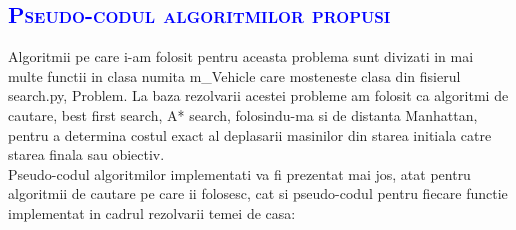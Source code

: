 \documentclass{article}
\begin{document}
\newpage
	\begin{center}
	    \textcolor{blue}{\section{\bfseries\scshape\textcolor{blue}{Pseudo-codul algoritmilor propusi}}}
	   \vspace{10mm}
	\end{center}
\quad Algoritmii pe care i-am folosit pentru aceasta problema sunt divizati in mai multe functii in clasa numita m\_Vehicle care mosteneste clasa din fisierul search.py, Problem. La baza rezolvarii acestei probleme am folosit ca algoritmi de cautare, best first search, A* search, folosindu-ma si de distanta Manhattan, pentru a determina costul exact al deplasarii masinilor din starea initiala catre starea finala sau obiectiv.
\newline \\
Pseudo-codul algoritmilor implementati va fi prezentat mai jos, atat pentru algoritmii de cautare pe care ii folosesc, cat si pseudo-codul pentru fiecare functie implementat in cadrul rezolvarii temei de casa: \par
\vspace{5mm}
\quad 
\end{document}
